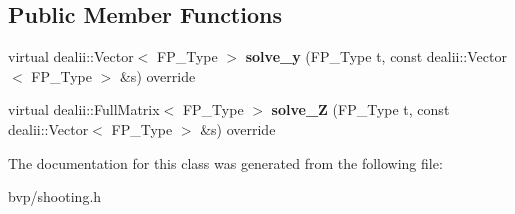 \subsection*{Public Member Functions}
\begin{DoxyCompactItemize}
\item 
\mbox{\label{classSF__External_ad80038af682e4d08a8761203306fe02a}} 
virtual dealii\+::\+Vector$<$ F\+P\+\_\+\+Type $>$ {\bfseries solve\+\_\+y} (F\+P\+\_\+\+Type t, const dealii\+::\+Vector$<$ F\+P\+\_\+\+Type $>$ \&s) override
\item 
\mbox{\label{classSF__External_a2e55e1f0cd36226486d2db443c930868}} 
virtual dealii\+::\+Full\+Matrix$<$ F\+P\+\_\+\+Type $>$ {\bfseries solve\+\_\+Z} (F\+P\+\_\+\+Type t, const dealii\+::\+Vector$<$ F\+P\+\_\+\+Type $>$ \&s) override
\end{DoxyCompactItemize}


The documentation for this class was generated from the following file\+:\begin{DoxyCompactItemize}
\item 
bvp/shooting.\+h\end{DoxyCompactItemize}
